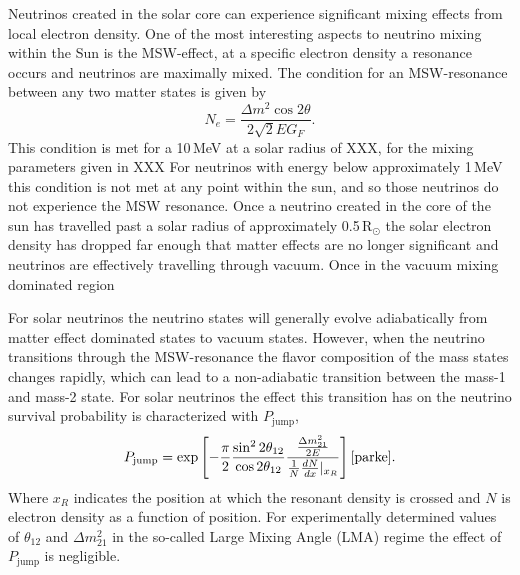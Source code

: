 Neutrinos created in the solar core can experience significant mixing effects from local
electron density.
One of the most interesting aspects to neutrino mixing within the Sun is the MSW-effect,
at a specific electron density a resonance occurs and neutrinos are maximally mixed.
The condition for an MSW-resonance between any two matter states is given by
\begin{equation}
    N_{e} = \frac{\Delta m^{2} \cos2\theta}{2\sqrt{2}EG_{F}}\text{.}
\end{equation}
This condition is met for a 10\,MeV at a solar radius of XXX, for the mixing parameters
given in XXX %
For neutrinos with energy below approximately 1\,MeV this condition is not met
at any point within the sun, and so those neutrinos do not experience the MSW
resonance.
Once a neutrino created in the core of the sun has travelled past a solar radius of
approximately 0.5\,$\text{R}_{\odot}$ %
the solar electron density has dropped far enough that matter effects are no longer significant
and neutrinos are effectively travelling through vacuum. Once in the vacuum mixing dominated region

For solar neutrinos the neutrino states will generally evolve adiabatically from
matter effect dominated states to vacuum states.
However, when the neutrino transitions through the MSW-resonance
the flavor composition of the mass states changes rapidly,
which can lead to a non-adiabatic transition
between the mass-1 and mass-2 state.
For solar neutrinos the effect this transition has on the
neutrino survival probability is characterized with $P_{\mathrm{jump}}$,
\begin{equation}
    P_{\mathrm{jump}} = \mathrm{exp}\left[-\dfrac{\pi}{2} \dfrac{\sin^{2}2\theta_{12}}{\cos2\theta_{12}}
               \dfrac{\frac{\Delta m^{2}_{21}}{2E}}{\frac{1}{N} \frac{dN}{dx}|_{x_{R}}}   \right]
\text{\cite{parke}.}
\end{equation}
Where $x_{R}$ indicates the position at which the resonant density is crossed
and $N$ is electron density as a function of position.
For experimentally determined values of $\theta_{12}$ and $\Delta m^{2}_{21}$ in the so-called
Large Mixing Angle (LMA) regime the effect of $P_{\mathrm{jump}}$ is negligible.

